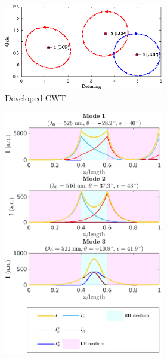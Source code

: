 \begin{figure}
\begin{subfigure}{0.49\textwidth}
\begin{subfigure}{\textwidth}
			\caption{}
			\label{fig:hybrid_cavity:mycwt_contour}
		\end{subfigure}
	\end{subfigure}
	\begin{subfigure}{0.49\textwidth}
		\begin{subfigure}{\textwidth}
			\includegraphics[width=\textwidth]{plots/hybrid/modes_found}
			\caption{Developed CWT}
			\label{fig:hybrid_cavity:modes_found}
		\end{subfigure}
		\begin{subfigure}{\textwidth}
			\includegraphics[width=\textwidth]{plots/hybrid/intensity_distribution}

\end{subfigure}
\end{subfigure}
\end{figure}
